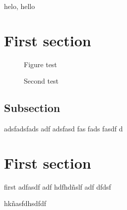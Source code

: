 helo, hello
\section{First section}
\blindtext[2]
\begin{figure}
	\begin{center}
			
	\end{center}
	\caption{Figure test}
\end{figure}
\blindtext[1]
\begin{figure}
	\begin{center}
			
	\end{center}
	\caption{Second test}
\end{figure}
\blindtext[2]

\subsection{Subsection}
adsfadsfads adf adsfasd fas fads fasdf d

\section{First section}
first adfasdf adf hdfhdñslf adf dfdsf

hkñasfdhsdfdf
